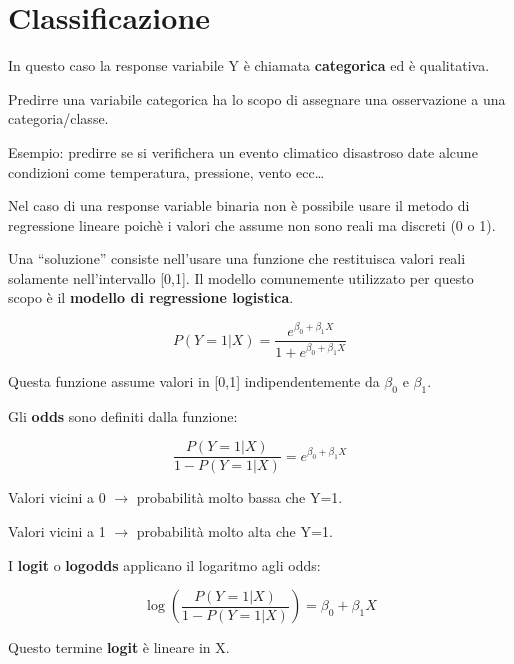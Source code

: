 \section{Classificazione}

In questo caso la response variabile Y è chiamata \textbf{categorica} ed è
qualitativa.

Predirre una variabile categorica ha lo scopo di assegnare una osservazione
a una categoria/classe.

Esempio: predirre se si verifichera un evento climatico disastroso date alcune
condizioni come temperatura, pressione, vento ecc\dots

Nel caso di una response variable binaria non è possibile usare il metodo di
regressione lineare poichè i valori che assume non sono reali ma discreti (0 o
1).

Una ``soluzione'' consiste nell'usare una funzione che restituisca valori reali
solamente nell'intervallo [0,1]. Il modello comunemente utilizzato per questo
scopo è il \textbf{modello di regressione logistica}.

\begin{equation}
P(Y=1|X) = \frac{e^{\beta_0+\beta_1 X}}{1 + e^{\beta_0+\beta_1 X}}
\end{equation}

Questa funzione assume valori in [0,1] indipendentemente da $\beta_0$ e
$\beta_1$.

Gli \textbf{odds} sono definiti dalla funzione:

\begin{equation}
\frac{P(Y=1|X)}{1-P(Y=1|X)} = e^{\beta_0+\beta_1 X}
\end{equation}

Valori vicini a 0 $\rightarrow$ probabilità molto bassa che Y=1.

Valori vicini a 1 $\rightarrow$ probabilità molto alta che Y=1.

I \textbf{logit} o \textbf{logodds} applicano il logaritmo agli odds:

\begin{equation}
\log \left( \frac{P(Y=1|X)}{1-P(Y=1|X)} \right) = \beta_0+\beta_1 X
\end{equation}

Questo termine \textbf{logit} è lineare in X.








